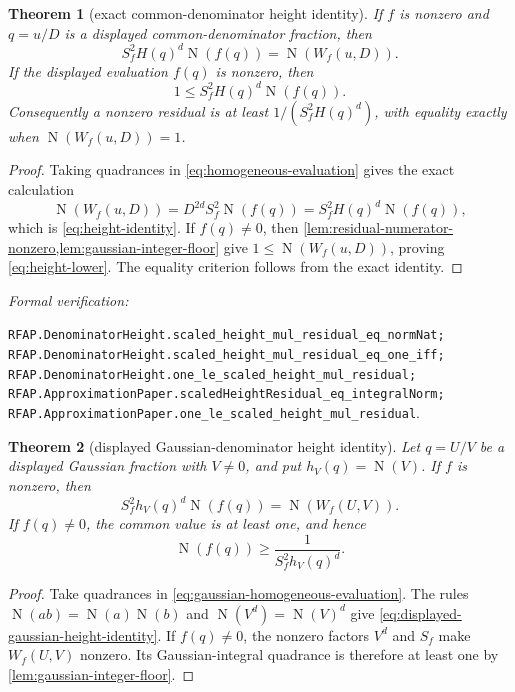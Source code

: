 \documentclass[11pt]{article}
\newtheorem{theorem}{Theorem}[section]
\newcommand{\Norm}[1]{\operatorname{N}\!\left(#1\right)}
\newcommand{\leanref}[1]{\par\smallskip\noindent
  \emph{Formal verification:}\par\nobreak
  {\raggedright\nolinkurl{#1}.\par}}
\begin{document}
\begin{theorem}[exact common-denominator height identity]
\label{lem:height-lower}
If $f$ is nonzero and $q=u/D$ is a displayed common-denominator fraction,
then
\begin{equation}
\label{eq:height-identity}
 S_f^2H(q)^d\Norm{f(q)}=\Norm{W_f(u,D)}.
\end{equation}
If the displayed evaluation $f(q)$ is nonzero, then
\begin{equation}
\label{eq:height-lower}
                 1\le S_f^2H(q)^d\Norm{f(q)}.
\end{equation}
Consequently a nonzero residual is at least
$1/(S_f^2H(q)^d)$, with equality exactly when $\Norm{W_f(u,D)}=1$.
\end{theorem}

\begin{proof}
Taking quadrances in \eqref{eq:homogeneous-evaluation} gives the exact
calculation
\[
 \Norm{W_f(u,D)}=D^{2d}S_f^2\Norm{f(q)}
   =S_f^2H(q)^d\Norm{f(q)},
\]
which is \eqref{eq:height-identity}.  If $f(q)\ne0$, then
\cref{lem:residual-numerator-nonzero,lem:gaussian-integer-floor} give
$1\le\Norm{W_f(u,D)}$, proving \eqref{eq:height-lower}.  The equality
criterion follows from the exact identity.
\end{proof}

\leanref{RFAP.DenominatorHeight.scaled_height_mul_residual_eq_normNat;
RFAP.DenominatorHeight.scaled_height_mul_residual_eq_one_iff;
RFAP.DenominatorHeight.one_le_scaled_height_mul_residual;
RFAP.ApproximationPaper.scaledHeightResidual_eq_integralNorm;
RFAP.ApproximationPaper.one_le_scaled_height_mul_residual}

\begin{theorem}[displayed Gaussian-denominator height identity]
\label{thm:displayed-gaussian-height-lower}
Let $q=U/V$ be a displayed Gaussian fraction with $V\ne0$, and put
$h_V(q)=\Norm V$.  If $f$ is nonzero, then
\begin{equation}
\label{eq:displayed-gaussian-height-identity}
 S_f^2h_V(q)^d\Norm{f(q)}=\Norm{W_f(U,V)}.
\end{equation}
If $f(q)\ne0$, the common value is at least one, and hence
\begin{equation}
\label{eq:displayed-gaussian-height-lower}
                         \Norm{f(q)}\ge
                         \frac1{S_f^2h_V(q)^d}.
\end{equation}
\end{theorem}

\begin{proof}
Take quadrances in \eqref{eq:gaussian-homogeneous-evaluation}.  The rules
$\Norm{ab}=\Norm a\Norm b$ and $\Norm{V^d}=\Norm V^d$ give
\eqref{eq:displayed-gaussian-height-identity}.  If $f(q)\ne0$, the nonzero factors
$V^d$ and $S_f$ make $W_f(U,V)$ nonzero.  Its Gaussian-integral quadrance is
therefore at least one by \cref{lem:gaussian-integer-floor}.
\end{proof}
\end{document}
